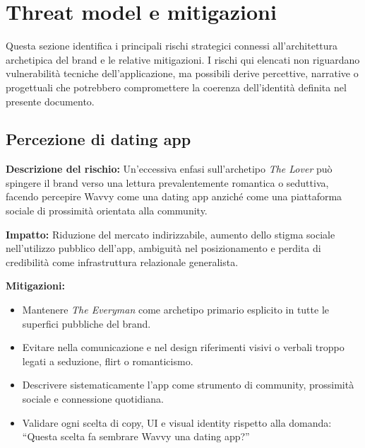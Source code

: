 \documentclass[a4paper, 11pt, table, dvipsnames]{article}
\begin{document}
\section{Threat model e mitigazioni}

Questa sezione identifica i principali rischi strategici
connessi all'architettura archetipica del brand e le
relative mitigazioni. I rischi qui elencati non riguardano
vulnerabilità tecniche dell'applicazione, ma possibili
derive percettive, narrative o progettuali che potrebbero compromettere
la coerenza dell'identità definita nel presente documento.

\subsection{Percezione di dating app}

\textbf{Descrizione del rischio:} Un'eccessiva enfasi sull'archetipo
\textit{The Lover} può spingere il brand verso una lettura
prevalentemente romantica o seduttiva, facendo percepire Wavvy
come una dating app anziché come una piattaforma sociale di
prossimità orientata alla community.

\textbf{Impatto:} Riduzione del mercato indirizzabile, aumento
dello stigma sociale nell'utilizzo pubblico dell'app,
ambiguità nel posizionamento e perdita di credibilità come
infrastruttura relazionale generalista.

\textbf{Mitigazioni:}
\begin{itemize}
      \item Mantenere \textit{The Everyman} come archetipo
            primario esplicito in tutte le superfici pubbliche del
            brand.

      \item Evitare nella comunicazione e nel design riferimenti
            visivi o verbali troppo legati a seduzione, flirt o
            romanticismo.

      \item Descrivere sistematicamente l'app come strumento di
            community, prossimità sociale e connessione quotidiana.

      \item Validare ogni scelta di copy, UI e visual identity
            rispetto alla domanda: \enquote{Questa scelta fa sembrare Wavvy una dating app?}
\end{itemize}
\end{document}
